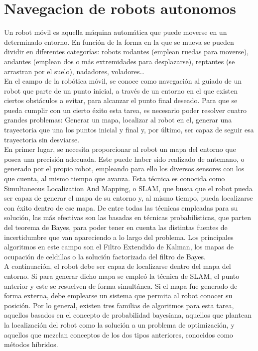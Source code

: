 \section{Navegacion de robots autonomos}
\label{navegacion_de_robots}

Un robot móvil es aquella máquina automática que puede moverse en un determinado entorno. En función de la forma en la que se mueva se pueden dividir en diferentes categorías: robots rodantes (emplean ruedas para moverse), andantes (emplean dos o más extremidades para desplazarse), reptantes (se arrastran por el suelo), nadadores, voladores…\\

En el campo de la robótica móvil, se conoce como navegación al guiado de un robot que parte de un punto inicial, a través de un entorno en el que existen ciertos obstáculos a evitar, para alcanzar el punto final deseado. Para que se pueda cumplir con un cierto éxito esta tarea, es necesario poder resolver cuatro grandes problemas: Generar un mapa, localizar al robot en el, generar una trayectoria que una los puntos inicial y final y, por último, ser capaz de seguir esa trayectoria sin desviarse.\\

En primer lugar, se necesita proporcionar al robot un mapa del entorno que posea una precisión adecuada. Este puede haber sido realizado de antemano, o generado por el propio robot, empleando para ello los diversos sensores con los que cuenta, al mismo tiempo que avanza. Esta técnica es conocida como Simultaneous Localization And Mapping, o SLAM, que busca que el robot pueda ser capaz de generar el mapa de su entorno y, al mismo tiempo,  pueda localizarse con éxito dentro de ese mapa. De entre todas las técnicas empleadas para su solución, las más efectivas son las basadas en técnicas probabilísticas, que parten del teorema de Bayes, para poder tener en cuenta las distintas fuentes de incertidumbre que van apareciendo a lo largo del problema. Los principales algoritmos en este campo son el Filtro Extendido de Kalman, los mapas de ocupación de celdillas o la solución factorizada del filtro de Bayes.\\

A continuación, el robot debe ser capaz de localizarse dentro del mapa del entorno. Si para generar dicho mapa se empleó la técnica de SLAM, el punto anterior y este se resuelven de forma simultánea. Si el mapa fue generado de forma externa, debe emplearse un sistema que permita al robot conocer su posición. Por lo general, existen tres familias de algoritmos para esta tarea, aquellos basados en el concepto de probabilidad bayesiana, aquellos que plantean la localización del robot como la solución a un problema de optimización, y aquellos que mezclan conceptos de los dos tipos anteriores, conocidos como métodos híbridos.\\

